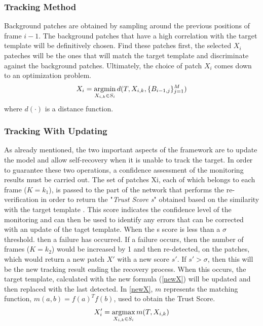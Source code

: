 \subsubsection{Tracking Method}
Background patches are obtained by sampling around the previous positions 
of frame $i-1$. The background patches that have a high correlation with 
the target template will be definitively chosen. Find these patches first, the 
selected $X_i$ pateches will be the ones that will match the target template and 
discriminate against the background patches. Ultimately, the choice of 
patch $X_i$ comes down to an optimization problem.
\begin{equation}
    X_i = \operatorname*{argmin}_{X_{i,k} \in S_i}d(T,X_{i,k}, \{B_{i-1,j}\}^M_{j=1})
\end{equation}
where $d(\cdot)$ is a distance function.

\subsubsection{Tracking With Updating}
As already mentioned, the two important aspects of the framework are to update the model and allow self-recovery when it is unable to track the target. In order to guarantee these two operations, a confidence assessment of the monitoring results must be carried out. The set of patches Xi, each of which belongs to each frame ($K = k_1$), is passed to the part of the network that performs the re-verification in order to return the "\emph{Trust Score s}" obtained based on the similarity with the target template . This score indicates the confidence level of the monitoring and can then be used to identify any errors that can be corrected with an update of the taget template. When the s score is less than a $\sigma$ threshold. then a failure has occurred. If a failure occurs, then the number of frames ($K = k_2$) would be increased by 1 and then re-detected, on the patches, which would return a new patch $X'$ with a new score $s'$. If $s'> \sigma$, then this will be the new tracking result ending the recovery process. When this occurs, the target template, calculated with the new formula (\ref{newX}) will be updated and then replaced with the last detected. In \ref{newX}, $m$ represents the matching function, $m(a,b)=f(a)^Tf(b)$, used to obtain the Trust Score. 
\begin{equation}\label{newX}
    X'_i = \operatorname*{argmax}_{X_{i,k} \in S_i}m(T,X_{i,k})
\end{equation}

